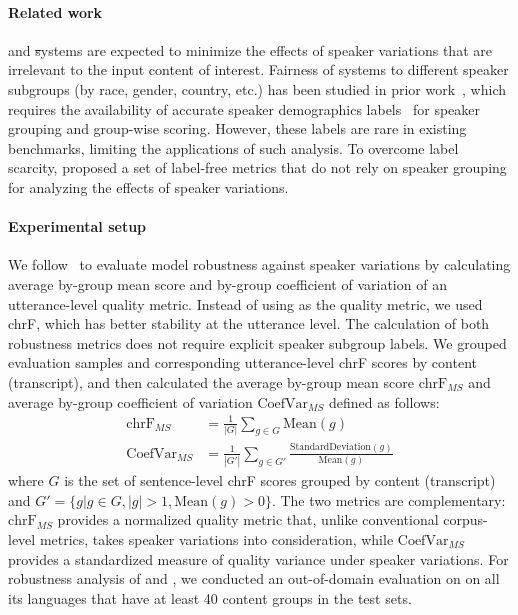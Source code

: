 \paragraph{Related work} \asr and \st systems are expected to minimize the effects of speaker variations that are irrelevant to the input content of interest. Fairness of \asr systems to different speaker subgroups (by race, gender, country, etc.) has been studied in prior work~\citep{liu2022towards,dheram2022toward}, which requires the availability of accurate speaker demographics labels~\citep{hazirbas2021casual,porgali2023casual} for speaker grouping and group-wise scoring. However, these labels are rare in existing \asr benchmarks, limiting the applications of such analysis. To overcome label scarcity, \cite{wang-etal-2020-covost} proposed a set of label-free metrics that do not rely on speaker grouping for analyzing the effects of speaker variations.

\paragraph{Experimental setup} We follow~\cite{wang-etal-2020-covost} to evaluate model robustness against speaker variations by calculating average by-group mean score and by-group coefficient of variation of an utterance-level quality metric. Instead of using \bleu as the quality metric, we used chrF, which has better stability at the utterance level. The calculation of both robustness metrics does not require explicit speaker subgroup labels. We grouped evaluation samples and corresponding utterance-level chrF scores by content (transcript), and then calculated the average by-group mean score $\textrm{chrF}_{MS}$ and average by-group coefficient of variation $\textrm{CoefVar}_{MS}$ defined as follows:
\begin{align*}
    \textrm{chrF}_{MS}&=\frac{1}{|G|}\sum_{g\in G}\textrm{Mean}(g) \\
    \textrm{CoefVar}_{MS}&=\frac{1}{|G'|}\sum_{g\in G'}\frac{\textrm{StandardDeviation}(g)}{\textrm{Mean}(g)}
\end{align*}
where $G$ is the set of sentence-level chrF scores grouped by content (transcript) and
$G' = \{g | g\in G, |g|>1, \textrm{Mean}(g) > 0 \}$.
The two metrics are complementary: $\textrm{chrF}_{MS}$ provides a normalized quality metric that, unlike conventional corpus-level metrics, takes speaker variations into consideration, while $\textrm{CoefVar}_{MS}$ provides a standardized measure of quality variance under speaker variations. 
For robustness analysis of \mfourtlg and \whisperlarge, we conducted an out-of-domain evaluation on \fleurs on all its languages that have at least 40 content groups in the test sets.

